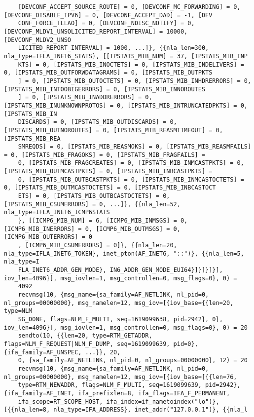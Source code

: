 \documentclass[pdf, unicode, 12pt, a4paper,oneside,fleqn]{article}
\begin{document}
{\begin{verbatim}
    [DEVCONF_ACCEPT_SOURCE_ROUTE] = 0, [DEVCONF_MC_FORWARDING] = 0, [DEVCONF_DISABLE_IPV6] = 0, [DEVCONF_ACCEPT_DAD] = -1, [DEV
    CONF_FORCE_TLLAO] = 0, [DEVCONF_NDISC_NOTIFY] = 0, [DEVCONF_MLDV1_UNSOLICITED_REPORT_INTERVAL] = 10000, [DEVCONF_MLDV2_UNSO
    LICITED_REPORT_INTERVAL] = 1000, ...]}, {{nla_len=300, nla_type=IFLA_INET6_STATS}, [[IPSTATS_MIB_NUM] = 37, [IPSTATS_MIB_INP
    KTS] = 0, [IPSTATS_MIB_INOCTETS] = 0, [IPSTATS_MIB_INDELIVERS] = 0, [IPSTATS_MIB_OUTFORWDATAGRAMS] = 0, [IPSTATS_MIB_OUTPKTS
    ] = 0, [IPSTATS_MIB_OUTOCTETS] = 0, [IPSTATS_MIB_INHDRERRORS] = 0, [IPSTATS_MIB_INTOOBIGERRORS] = 0, [IPSTATS_MIB_INNOROUTES
    ] = 0, [IPSTATS_MIB_INADDRERRORS] = 0, [IPSTATS_MIB_INUNKNOWNPROTOS] = 0, [IPSTATS_MIB_INTRUNCATEDPKTS] = 0, [IPSTATS_MIB_IN
    DISCARDS] = 0, [IPSTATS_MIB_OUTDISCARDS] = 0, [IPSTATS_MIB_OUTNOROUTES] = 0, [IPSTATS_MIB_REASMTIMEOUT] = 0, [IPSTATS_MIB_REA
    SMREQDS] = 0, [IPSTATS_MIB_REASMOKS] = 0, [IPSTATS_MIB_REASMFAILS] = 0, [IPSTATS_MIB_FRAGOKS] = 0, [IPSTATS_MIB_FRAGFAILS] = 
    0, [IPSTATS_MIB_FRAGCREATES] = 0, [IPSTATS_MIB_INMCASTPKTS] = 0, [IPSTATS_MIB_OUTMCASTPKTS] = 0, [IPSTATS_MIB_INBCASTPKTS] = 
    0, [IPSTATS_MIB_OUTBCASTPKTS] = 0, [IPSTATS_MIB_INMCASTOCTETS] = 0, [IPSTATS_MIB_OUTMCASTOCTETS] = 0, [IPSTATS_MIB_INBCASTOCT
    ETS] = 0, [IPSTATS_MIB_OUTBCASTOCTETS] = 0, [IPSTATS_MIB_CSUMERRORS] = 0, ...]}, {{nla_len=52, nla_type=IFLA_INET6_ICMP6STATS
    }, [[ICMP6_MIB_NUM] = 6, [ICMP6_MIB_INMSGS] = 0, [ICMP6_MIB_INERRORS] = 0, [ICMP6_MIB_OUTMSGS] = 0, [ICMP6_MIB_OUTERRORS] = 0
    , [ICMP6_MIB_CSUMERRORS] = 0]}, {{nla_len=20, nla_type=IFLA_INET6_TOKEN}, inet_pton(AF_INET6, "::")}, {{nla_len=5, nla_type=I
    FLA_INET6_ADDR_GEN_MODE}, IN6_ADDR_GEN_MODE_EUI64}]}]}]}], iov_len=4096}], msg_iovlen=1, msg_controllen=0, msg_flags=0}, 0) = 
    4092
    recvmsg(10, {msg_name={sa_family=AF_NETLINK, nl_pid=0, nl_groups=00000000}, msg_namelen=12, msg_iov=[{iov_base={{len=20, type=NLM
    SG_DONE, flags=NLM_F_MULTI, seq=1619099638, pid=2942}, 0}, iov_len=4096}], msg_iovlen=1, msg_controllen=0, msg_flags=0}, 0) = 20
    sendto(10, {{len=20, type=RTM_GETADDR, flags=NLM_F_REQUEST|NLM_F_DUMP, seq=1619099639, pid=0}, {ifa_family=AF_UNSPEC, ...}}, 20, 
    0, {sa_family=AF_NETLINK, nl_pid=0, nl_groups=00000000}, 12) = 20
    recvmsg(10, {msg_name={sa_family=AF_NETLINK, nl_pid=0, nl_groups=00000000}, msg_namelen=12, msg_iov=[{iov_base=[{{len=76, 
    type=RTM_NEWADDR, flags=NLM_F_MULTI, seq=1619099639, pid=2942}, {ifa_family=AF_INET, ifa_prefixlen=8, ifa_flags=IFA_F_PERMANENT,
    ifa_scope=RT_SCOPE_HOST, ifa_index=if_nametoindex("lo")}, [{{nla_len=8, nla_type=IFA_ADDRESS}, inet_addr("127.0.0.1")}, {{nla_l

\end{verbatim}}
\end{document}

